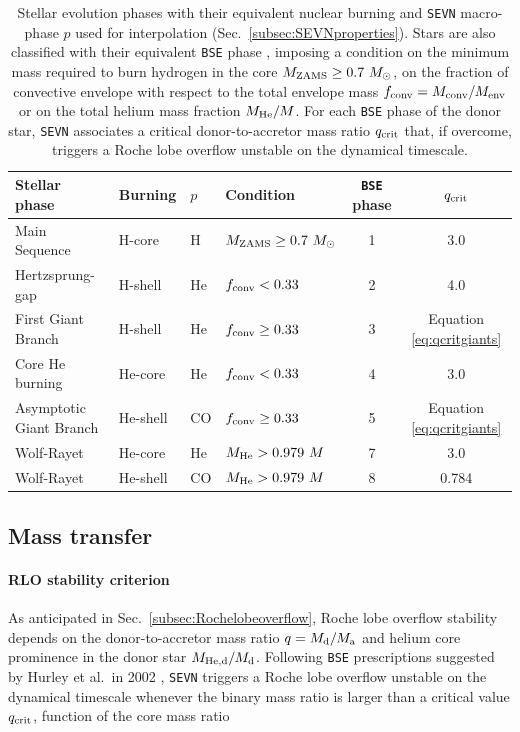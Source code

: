 \documentclass[a4paper,titlepage]{book}     	%
\newcommand{\sun}{\ensuremath{_\odot}}
\newcommand{\mzams}{M_\textup{ZAMS}}
\newcommand{\msun}{\ensuremath{M\sun}}
\begin{document}
\begin{table}
    \centering
    \begin{tabular}{llllcc}
        \toprule
        Stellar phase & Burning & $p$ & Condition & \texttt{BSE} phase &  $q_{\rm crit}$ \\ 
        \midrule
        Main Sequence           & H-core    &  H   & $\mzams \geq 0.7~\msun$          &  1  & 3.0        \\
        Hertzsprung-gap         & H-shell   &  He  & $f_{\rm conv} < 0.33$       &  2  & 4.0        \\
        First Giant Branch      & H-shell   &  He  & $f_{\rm conv} \geq 0.33$    &  3  & Equation \ref{eq:qcritgiants} \\
        Core He burning         & He-core   &  He  & $f_{\rm conv} < 0.33$       &  4  & 3.0 \\ 
        Asymptotic Giant Branch & He-shell  &  CO  & $f_{\rm conv} \geq 0.33$    &  5  & Equation \ref{eq:qcritgiants} \\
        \hline
        Wolf-Rayet              & He-core   &  He  & $M_{\rm He} > 0.979~M$  &  7  & 3.0 \\ 
        Wolf-Rayet              & He-shell  &  CO  & $M_{\rm He} > 0.979~M$  &  8  & 0.784 \\ 
        \bottomrule
        \end{tabular}
    \caption{Stellar evolution phases with their equivalent nuclear burning and \texttt{SEVN} macro-phase $p$ used for interpolation (Sec.\ \ref{subsec:SEVNproperties}). Stars are also classified with their equivalent \texttt{BSE} phase \cite{Hurley2002}, imposing a condition on the minimum mass required to burn hydrogen in the core $\mzams \geq 0.7~\msun$, on the fraction of convective envelope with respect to the total envelope mass $f_{\rm conv}= M_{\rm conv}/M_{\rm env}$ or on the total helium mass fraction $M_{\rm He}/M$. For each \texttt{BSE} phase of the donor star, \texttt{SEVN} associates a critical donor-to-accretor mass ratio $q_{\rm crit}$ that, if overcome, triggers a Roche lobe overflow unstable on the dynamical timescale.}\label{tab:phasesqcritSEVN}
\end{table}



\subsection{Mass transfer}\label{subsec:masstransferSEVN}
\paragraph{RLO stability criterion} As anticipated in Sec.\ \ref{subsec:Rochelobeoverflow}, Roche lobe overflow stability depends on the donor-to-accretor mass ratio $q=M_{\rm d}/M_{\rm a}$ and helium core prominence in the donor star $M_{\rm He,d}/M_{\rm d}$. Following \texttt{BSE} prescriptions suggested by Hurley et al.\ in 2002 \cite{Hurley2002}, \texttt{SEVN} triggers a Roche lobe overflow unstable on the dynamical timescale whenever the binary mass ratio is larger than a critical value $q_{\rm crit}$, function of the core mass ratio
\end{document}

